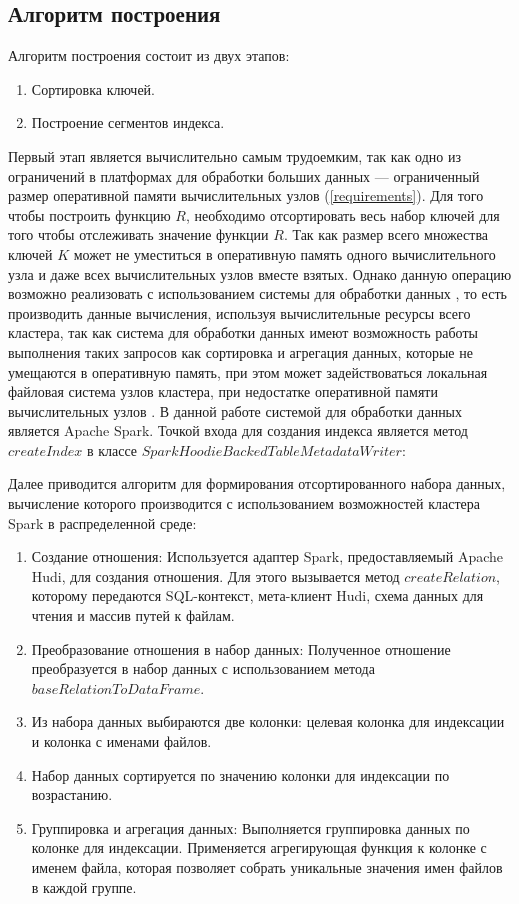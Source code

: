 \subsection{Алгоритм построения}

Алгоритм построения состоит из двух этапов:

\begin{enumerate}
    \item {Сортировка ключей}.
    \item {Построение сегментов индекса}.
\end{enumerate}

Первый этап является вычислительно самым трудоемким, так как одно из ограничений в платформах для обработки больших данных --- ограниченный размер оперативной памяти вычислительных узлов (\ref{requirements}). Для того чтобы построить функцию $R$, необходимо отсортировать весь набор ключей для того чтобы отслеживать значение функции $R$. Так как размер всего множества ключей $K$ может не уместиться в оперативную память одного вычислительного узла и даже всех вычислительных узлов вместе взятых. Однако данную операцию возможно реализовать с использованием системы для обработки данных , то есть производить данные вычисления, используя вычислительные ресурсы всего кластера, так как система для обработки данных имеют возможность работы выполнения таких запросов как сортировка и агрегация данных, которые не умещаются в оперативную память, при этом может задействоваться локальная файловая система узлов кластера, при недостатке оперативной памяти вычислительных узлов . В данной работе системой для обработки данных является Apache Spark. Точкой входа для создания индекса является метод $createIndex$ в классе $SparkHoodieBackedTableMetadataWriter$:

Далее приводится алгоритм для формирования отсортированного набора данных, вычисление которого производится с использованием возможностей кластера Spark в распределенной среде:

\begin{enumerate}
    \item Создание отношения: Используется адаптер Spark, предоставляемый Apache Hudi, для создания отношения. Для этого вызывается метод $createRelation$, которому передаются SQL-контекст, мета-клиент Hudi, схема данных для чтения и массив путей к файлам.
    \item Преобразование отношения в набор данных: Полученное отношение преобразуется в набор данных с использованием метода $baseRelationToDataFrame$.
    \item Из набора данных выбираются две колонки: целевая колонка для индексации и колонка с именами файлов.
    \item Набор данных сортируется по значению колонки для индексации по возрастанию.
    \item Группировка и агрегация данных: Выполняется группировка данных по колонке для индексации. Применяется агрегирующая функция к колонке с именем файла, которая позволяет собрать уникальные значения имен файлов в каждой группе.
\end{enumerate}


